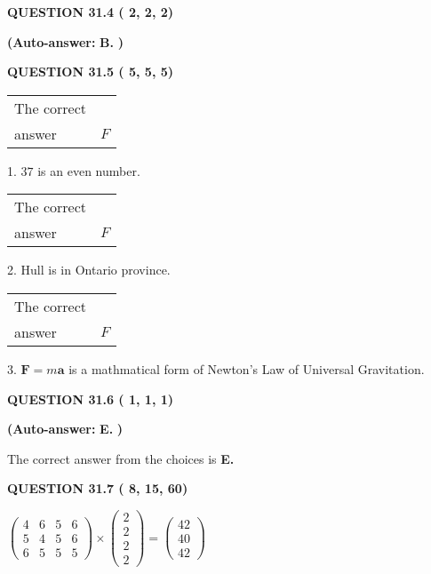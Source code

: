 \documentclass[12pt]{article}
\begin{document}
  
\noindent{}
 
 
  
  
{\textbf{\large{QUESTION
31.4 
 (          2,          2,          2)
}}}
 
 
{\textbf{(Auto-answer:}}
{\textbf{\large{
B.}}}
{\textbf{)}}
 
 
  
  
{\textbf{\large{QUESTION
31.5 
 (          5,          5,          5)
}}}

 
\noindent\begin{tabular}{|l|l|}\hline The correct & \\
          answer &  %
$F$ \\ \hline \end{tabular}
1. $ %
37$ is an  %
even number.
 
\noindent\begin{tabular}{|l|l|}\hline The correct & \\
          answer &  %
$F$ \\ \hline \end{tabular}
2.  %
Hull is in  %
Ontario province.
 
\noindent\begin{tabular}{|l|l|}\hline The correct & \\
          answer &  %
$F$ \\ \hline \end{tabular}
3.  %
$\mathbf{F}=m\mathbf{a}$ is a mathmatical form of  %
Newton's Law of Universal Gravitation.
 
  
  
{\textbf{\large{QUESTION
31.6 
 (          1,          1,          1)
}}}
 
 
{\textbf{(Auto-answer:}}
{\textbf{\large{
E.}}}
{\textbf{)}}
 
 

The correct answer from the choices is
{\textbf{\large{
E.}}}
 
  
  
{\textbf{\large{QUESTION
31.7 
 (          8,         15,         60)
}}}

 
$\left( \begin{array}{ccccccccccccccc}
           4 & 
           6 & 
           5 & 
           6 \\ 
           5 & 
           4 & 
           5 & 
           6 \\ 
           6 & 
           5 & 
           5 & 
           5
\end{array}\right) \times
\left( \begin{array}{c}
           2 \\ 
           2 \\ 
           2 \\ 
           2
\end{array}\right)  =
\left( \begin{array}{c}
          42 \\ 
          40 \\ 
          42
\end{array}\right)  $
 
\end{document}

